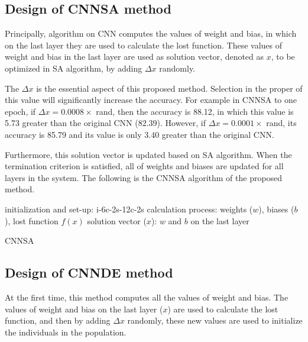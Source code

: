 \documentclass[10pt,letterpaper]{article}
\begin{document}
\subsection{Design of CNNSA method}

Principally, algorithm on CNN computes the values of weight and bias,  in which on the last layer they are used to calculate the lost function. These values of weight and bias in the last layer are used as solution vector, denoted as $x$, to be optimized in SA algorithm, by adding $\Delta x$ randomly. 

The $\Delta x$ is the essential aspect of this proposed method. Selection in the proper of this value will significantly increase the accuracy. For example in CNNSA to one epoch, if $\Delta x = 0.0008 \times$ rand, then the accuracy is 88.12, in which this value is 5.73 greater than the original CNN (82.39). However, if $\Delta x = 0.0001 \times$ rand, its accuracy is 85.79 and its value is only 3.40 greater than the original CNN.

Furthermore, this solution vector is updated based on SA algorithm. When the termination criterion is satisfied, all of weights and biases are updated for all layers in the system. The following is the CNNSA algorithm of the proposed method.

\begin{algorithm}[H]
\SetAlgoLined
{}
 initialization and set-up: i-6c-2s-12c-2s \;
 calculation process: weights ($w$), biases ($b$), lost function \(f(x)\)\; 
 solution vector ($x$): $w$ and $b$ on the last layer\; 
 
 
 \caption{CNNSA}
\end{algorithm}

\subsection{Design of CNNDE method}

At the first time, this method computes all the values of weight and bias. The values of weight and bias on the last layer ($x$) are used to calculate the lost function, and then by adding $\Delta x$ randomly, these new values are used to initialize the individuals in the population. 
\end{document}
